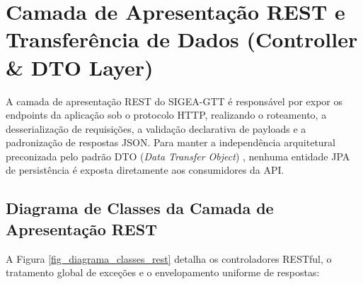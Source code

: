 \chapter{Camada de Apresentação REST e Transferência de Dados (Controller \& DTO Layer)}
\label{cap_camada_apresentacao}

A camada de apresentação REST do SIGEA-GTT é responsável por expor os endpoints da aplicação sob o protocolo HTTP, realizando o roteamento, a desserialização de requisições, a validação declarativa de payloads e a padronização de respostas JSON. Para manter a independência arquitetural preconizada pelo padrão DTO (\textit{Data Transfer Object}) \cite{fowler2002}, nenhuma entidade JPA de persistência é exposta diretamente aos consumidores da API.

\section{Diagrama de Classes da Camada de Apresentação REST}
\label{sec_diagrama_classes_rest}

A Figura \ref{fig_diagrama_classes_rest} detalha os controladores RESTful, o tratamento global de exceções e o envelopamento uniforme de respostas:

